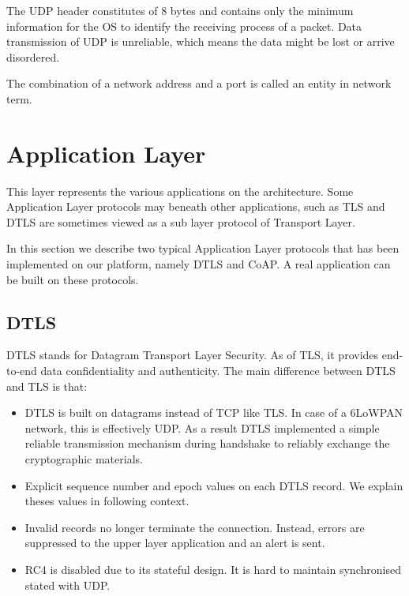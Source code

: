 The UDP header constitutes of 8 bytes and contains only the minimum information for the OS to identify the receiving process of a packet. Data transmission of UDP is unreliable, which means the data might be lost or arrive disordered.

The combination of a network address and a port is called an entity in network term.

\section{Application Layer}
This layer represents the various applications on the architecture. Some Application Layer protocols may beneath other applications, such as TLS and DTLS are sometimes viewed as a sub layer protocol of Transport Layer.

In this section we describe two typical Application Layer protocols that has been implemented on our platform, namely DTLS\cite{rfc6347} and CoAP\cite{rfc7252}. A real application can be built on these protocols.

\subsection{DTLS}
DTLS\cite{rfc6347} stands for Datagram Transport Layer Security. As of TLS, it provides end-to-end data confidentiality and authenticity. The main difference between DTLS and TLS is that:
\begin{itemize}
	\item DTLS is built on datagrams instead of TCP like TLS. In case of a 6LoWPAN network, this is effectively UDP. As a result DTLS implemented a simple reliable transmission mechanism during handshake to reliably exchange the cryptographic materials.
	\item Explicit sequence number and epoch values on each DTLS record. We explain theses values in following context.
	\item Invalid records no longer terminate the connection. Instead, errors are suppressed to the upper layer application and an alert is sent.
	\item RC4 is disabled due to its stateful design\cite{DtlsCiphers}. It is hard to maintain synchronised stated with UDP.
\end{itemize}


